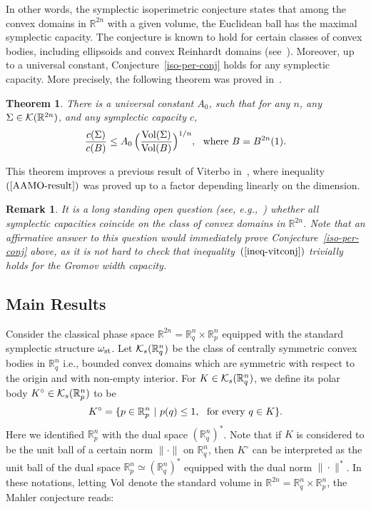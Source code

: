 \documentclass[11pt]{article}
\newtheorem{remark}[lemma]{Remark}
\newtheorem{theorem}[lemma]{Theorem}
\begin{document}
In other words, the symplectic isoperimetric  conjecture states that among the convex domains in ${\mathbb R}^{2n}$ 
with a given volume, the Euclidean ball has the maximal symplectic capacity. 
The %
conjecture is known to hold for certain classes of convex  bodies,
including ellipsoids and convex Reinhardt domains (see~\cite{Her}).
Moreover, up to a universal  constant,
Conjecture~\ref{iso-per-conj} %
holds for any symplectic capacity. More precisely, the following
theorem was proved in~\cite{AAMO}.
\begin{theorem} \label{up-to-uni-constnat} There is a universal constant $A_0$, such that for
any $n$, any $\Sigma \in {\cal K}({\mathbb R}^{2n})$, and any symplectic
capacity $c$, 
\begin{equation} \label{AAMO-result} {\frac {c(\Sigma)} {c(B)}} \leq A_0 \, \Bigl (
{\frac {{\rm Vol}(\Sigma)} {{\rm Vol}(B)}} \Bigr )^{1/n}, \ \ {\rm where}
\ B = B^{2n}(1). \end{equation}
\end{theorem}
This theorem improves a previous result of Viterbo in~\cite{V},
where inequality~$(\ref{AAMO-result})$ was proved up to a factor
depending linearly on the dimension. 
\begin{remark} {\rm 
It is a long standing open question (see, e.g.,~\cite{Her,Ho,V}) whether 
all symplectic capacities coincide on the class of convex domains in ${\mathbb R}^{2n}$.
Note that an affirmative answer to this question would immediately prove Conjecture~\ref{iso-per-conj} above, as it is not hard to check 
that  inequality~$(\ref{ineq-vitconj})$ trivially holds for the Gromov width capacity.
}
\end{remark}

\subsection{Main Results}
Consider the classical phase space ${\mathbb R}^{2n}  =
{\mathbb R}^n_q \times {\mathbb R}^n_p$  equipped with the standard symplectic structure $\omega_{\rm st}$. 
Let ${\cal K}_{s}({\mathbb R}_q^{n})$ be the class of centrally
symmetric convex bodies in ${\mathbb R}_q^{n}$ i.e.,  bounded
convex domains which are symmetric with respect to the origin and
with non-empty interior. For $K \in {\cal K}_s({\mathbb R}_q^n)$, we
define its polar body $K^{\circ} \in {\cal K}_s({\mathbb R}_p^n)$ to
be $$ K^{\circ} = \{p \in {\mathbb R}^n_p \ | \ p(q) \leq 1, \ \
{\rm for \ every \ } q \in K \}.$$ Here we identified ${\mathbb
R}^n_p$ with the dual space $({\mathbb R}^n_q)^*$. Note that if $K$
is considered to be the unit ball of a certain norm $\| \cdot \|$ on
${\mathbb R}_q^n$, then $K^{\circ}$ can be interpreted as the unit
ball of the dual space ${\mathbb R}_p^n \simeq ({\mathbb R}_q^n)^*$
equipped with the dual norm $\| \cdot \|^*$.
In these notations, letting  ${\rm Vol}$ denote the standard
volume in ${\mathbb R}^{2n} = {\mathbb R}^n_q \times {\mathbb
R}^n_p$, the Mahler conjecture reads:
\end{document}
